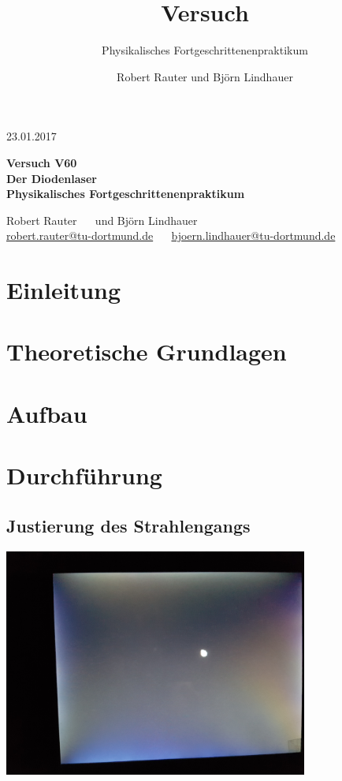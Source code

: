 \documentclass[captions=tableheading]{scrartcl}
\title{Versuch \versuchnummer\\ \versuchname}
\subtitle{Physikalisches Fortgeschrittenenpraktikum}
\author{Robert Rauter und Björn Lindhauer}
\date{\versuchdatum}
\newcommand{\versuchnummer}{V60}
\newcommand{\versuchname}{Der Diodenlaser}
\newcommand{\versuchdatum}{23.01.2017}
\begin{document}
\begin{titlepage}
{\large \versuchdatum}
\vspace{7cm}
\begin{center}
\textbf{\huge Versuch \versuchnummer}\\\vspace{0.5cm}
\textbf{\huge \versuchname}\\
\vspace{0.2cm}
\textbf{Physikalisches Fortgeschrittenenpraktikum}\\
\vspace{9cm}

{\Large Robert Rauter \ \ \hspace{1.5cm} und \hspace{1.5cm} Björn Lindhauer}\\
{ \url{robert.rauter@tu-dortmund.de} \ \ \hspace{2cm} \url{bjoern.lindhauer@tu-dortmund.de}}
\end{center}
\end{titlepage}
\section{Einleitung}

\section{Theoretische Grundlagen}

\section{Aufbau}

\section{Durchführung}

\subsection{Justierung des Strahlengangs}

\begin{center}
	\includegraphics[width=10cm]{images/led_spot.jpg}
	\label{fig:led}
\end{center}
\end{document}
